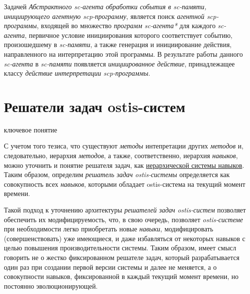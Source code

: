 Задачей \textit{Абстрактного sc-агента обработки события в sc-памяти, инициирующего агентную \mbox{scp-программу}}, является поиск \textit{агентной scp-программы}, входящей во множество \textit{программ sc-агента*} для каждого \textit{sc-агента}, первичное условие инициирования которого соответствует событию, произошедшему в \textit{sc-памяти}, а также генерация и инициирование действия, направленного на интерпретацию этой программы. В результате работы данного \textit{sc-агента} в \textit{sc-памяти} появляется \textit{инициированное действие}, принадлежащее классу \textit{действие} \textit{интерпретации scp-программы}.

\section{Решатели задач ostis-систем}
\label{sec_ps_ps}

\begin{SCn}
\begin{scnrelfromlist}{ключевое понятие}
\end{scnrelfromlist}
\end{SCn}

С учетом того тезиса, что существуют \textit{методы} интепретации других \textit{методов} и, следовательно, иерархия \textit{методов}, а также, соответственно, иерархия \textit{навыков}, можно уточнить и понятие решателя задач, как \uline{иерархической системы навыков}. Таким образом, определим \textit{решатель задач ostis-системы} определяется как совокупность всех \textit{навыков}, которыми обладает ostis-система на текущий момент времени. 

Такой подход к уточнению архитектуры \textit{решателей задач ostis-систем} позволяет обеспечить их модифицируемость, что, в свою очередь, позволяет \textit{ostis-системе} при необходимости легко приобретать новые \textit{навыки}, модифицировать (совершенствовать) уже имеющиеся, и даже избавляться от некоторых навыков с целью повышения производительности системы. Таким образом, имеет смысл говорить не о жестко фиксированном решателе задач, который разрабатывается один раз при создании первой версии системы и далее не меняется, а о совокупности навыков, фиксированной в каждый текущий момент времени, но постоянно эволюционирующей.

